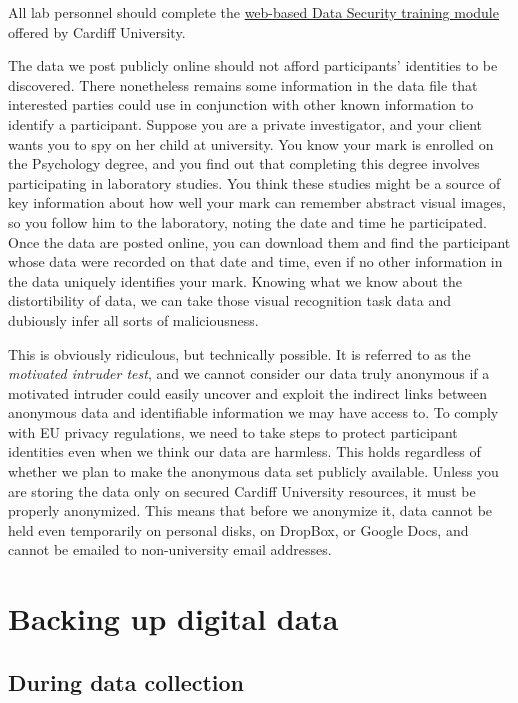 \documentclass[12pt,]{book}
\theoremstyle{definition}
\theoremstyle{definition}
\theoremstyle{definition}
\theoremstyle{remark}
\begin{document}
All lab personnel should complete the
\href{https://intranet.cardiff.ac.uk/staff/news/view/211993-information-security-training-when-will-you-complete-yours}{web-based
Data Security training module} offered by Cardiff University.

The data we post publicly online should not afford participants'
identities to be discovered. There nonetheless remains some information
in the data file that interested parties could use in conjunction with
other known information to identify a participant. Suppose you are a
private investigator, and your client wants you to spy on her child at
university. You know your mark is enrolled on the Psychology degree, and
you find out that completing this degree involves participating in
laboratory studies. You think these studies might be a source of key
information about how well your mark can remember abstract visual
images, so you follow him to the laboratory, noting the date and time he
participated. Once the data are posted online, you can download them and
find the participant whose data were recorded on that date and time,
even if no other information in the data uniquely identifies your mark.
Knowing what we know about the distortibility of data, we can take those
visual recognition task data and dubiously infer all sorts of
maliciousness.

This is obviously ridiculous, but technically possible. It is referred
to as the \emph{motivated intruder test}, and we cannot consider our
data truly anonymous if a motivated intruder could easily uncover and
exploit the indirect links between anonymous data and identifiable
information we may have access to. To comply with EU privacy
regulations, we need to take steps to protect participant identities
even when we think our data are harmless. This holds regardless of
whether we plan to make the anonymous data set publicly available.
Unless you are storing the data only on secured Cardiff University
resources, it must be properly anonymized. This means that before we
anonymize it, data cannot be held even temporarily on personal disks, on
DropBox, or Google Docs, and cannot be emailed to non-university email
addresses.

\section{Backing up digital data}\label{backing-up-digital-data}

\subsection{During data collection}\label{during-data-collection}
\end{document}
